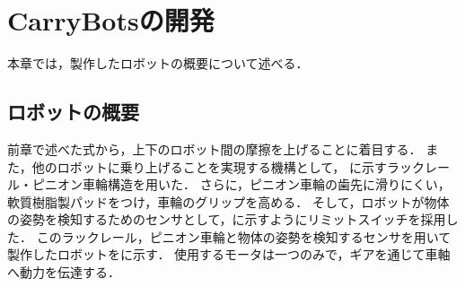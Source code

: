 \section{CarryBotsの開発}
本章では，製作したロボットの概要について述べる．

\subsection{ロボットの概要}
前章で述べた式から，上下のロボット間の摩擦を上げることに着目する．
また，他のロボットに乗り上げることを実現する機構として，
に示すラックレール・ピニオン車輪構造を用いた．
さらに，ピニオン車輪の歯先に滑りにくい，軟質樹脂製パッドをつけ，車輪のグリップを高める．
そして，ロボットが物体の姿勢を検知するためのセンサとして，に示すようにリミットスイッチを採用した．
このラックレール，ピニオン車輪と物体の姿勢を検知するセンサを用いて製作したロボットをに示す．
使用するモータは一つのみで，ギアを通じて車軸へ動力を伝達する．

